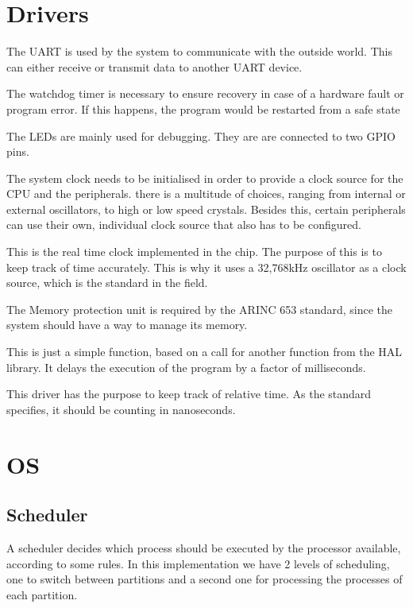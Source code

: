 \section{Drivers}
\begin{description}[align=left]
	\item [\textbf{UART driver}] The UART is used by the system to communicate with the outside
	world. This can either receive or transmit data to another UART device.
	\item [\textbf{Watchdog timer driver}] The watchdog timer is necessary to ensure recovery
	in case of a hardware fault or program error. If this happens, the program would be restarted
	from a safe state

	\item [\textbf{LEDs}]The LEDs are mainly used for debugging. They are
	are connected to two GPIO pins.
	\item [\textbf{System Clock}]The system clock needs to be initialised 
	in order to provide a clock source for the CPU and the peripherals.
	there is a multitude of choices, ranging from internal or external
	oscillators, to high or low speed crystals. Besides this, certain
	peripherals can use their own, individual clock source that also has
	to be configured.
	\item [\textbf{RTC}]This is the real time clock implemented in the 
	chip. The purpose of this is to keep track of time accurately. This 
	is why it uses a 32,768kHz oscillator as a clock source, which is 
	the standard in the field.
	\item [\textbf{MPU}]The Memory protection unit is required by the
	ARINC 653 standard, since the system should have a way to manage its
	memory.
	\item [\textbf{Delay}]This is just a simple function, based on a call
	for another function from the HAL library. It delays the execution 
	of the program by a factor of milliseconds.
	\item [\textbf{Timing}]This driver has the purpose to keep track of 
	relative time. As the standard specifies, it should be counting in 
	nanoseconds.

\end{description}

\section{OS}
\subsection{Scheduler}
A scheduler decides which process should be executed by the processor available, according to some rules. In this implementation we have 2 levels of scheduling, one to switch between partitions and a second one for processing the processes of each partition.

